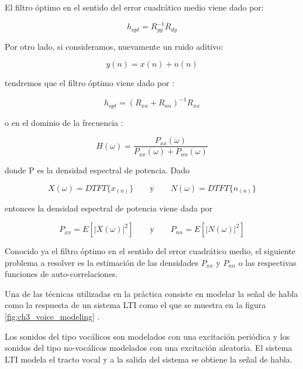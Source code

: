 El filtro óptimo en el sentido del error cuadrático medio viene dado por:

\begin{equation*}
	h_{opt} = R_{yy}^{-1} R_{dy}
\end{equation*}


Por otro lado, si consideramos, nuevamente un ruido aditivo:

\begin{equation*}
	y(n) = x(n) + n(n)
\end{equation*}

tendremos que el filtro óptimo viene dado por \cite{speech_enhancement_theory_and_practice}:

\begin{equation*}
	h_{opt} = \left( R_{xx} + R_{nn} \right)^{-1} R_{xx}
\end{equation*}

o en el dominio de la frecuencia \cite{speech_enhancement_theory_and_practice}:

\begin{equation*}
	H(\omega) = \frac{P_{xx}(\omega)}{P_{xx}(\omega) + P_{nn}(\omega)}
\end{equation*}

donde P es la densidad espectral de potencia. Dado

\begin{equation*}
	X(\omega) = DTFT\{ x_{(n)} \} \qquad \text{y} \qquad N(\omega) = DTFT\{ n_{(n)} \}
\end{equation*}

entonces la densidad espectral de potencia viene dada por \cite{intuitive_probability_and_random_processes_using_matlab}

\begin{equation*}
	P_{xx} = E[ | X(\omega) |^2 ] \qquad \text{y} \qquad P_{nn} = E[ | N(\omega) |^2 ]
\end{equation*}

Conocido ya el filtro óptimo en el sentido del error cuadrático medio, el siguiente problema a resolver es la estimación de las densidades $P_{xx}$ y $P_{nn}$ o las respectivas funciones de auto-correlaciones.

Una de las técnicas utilizadas en la práctica consiste en modelar la señal de habla como la respuesta de un sistema LTI como el que se muestra en la figura \ref{fig:ch3_voice_modeling} \cite{spoken_language_processing}. 

Los sonidos del tipo vocálicos son modelados con una excitación periódica y los sonidos del tipo no-vocálicos modelados con una excitación aleatoria. El sistema LTI modela el tracto vocal y a la salida del sistema se obtiene la señal de habla.

